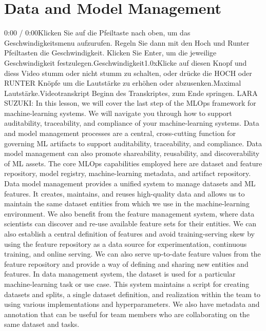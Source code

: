 {{{{{{{{\section{Data and Model Management}

    0:00 / 0:00Klicken Sie auf die Pfeiltaste nach oben, um das Geschwindigkeitsmenu aufzurufen. Regeln Sie dann mit den Hoch und Runter Pfeiltasten die Geschwindigkeit. Klicken Sie Enter, um die jeweilige Geschwindigkeit festzulegen.Geschwindigkeit1.0xKlicke auf diesen Knopf und diess Video stumm oder nicht stumm zu schalten, oder drücke die HOCH oder RUNTER Knöpfe um die Lautstärke zu erhöhen oder abzusenken.Maximal Lautstärke.Videotranskript
    Beginn des Transkriptes, zum Ende springen.
    LARA SUZUKI: In this lesson, we will cover the last step of the MLOps
    framework for machine-learning systems.
    We will navigate you through how to support auditability, traceability,
    and compliance of your machine-learning systems.
    Data and model management processes are a central, cross-cutting function
    for governing ML artifacts to support auditability, traceability,
    and compliance.
    Data model management can also promote shareability, reusability,
    and discoverability of ML assets.
    The core MLOps capabilities employed here
    are dataset and feature repository, model registry,
    machine-learning metadata, and artifact repository.
    Data model management provides a unified system
    to manage datasets and ML features.
    It creates, maintains, and reuses high-quality data
    and allows us to maintain the same dataset entities from which we use
    in the machine-learning environment.
    We also benefit from the feature management system,
    where data scientists can discover and re-use available feature sets
    for their entities.
    We can also establish a central definition of features
    and avoid training-serving skew by using the feature repository
    as a data source for experimentation, continuous training,
    and online serving.
    We can also serve up-to-date feature values from the feature repository
    and provide a way of defining and sharing new entities and features.
    In data management system, the dataset is
    used for a particular machine-learning task or use case.
    This system maintains a script for creating datasets and splits,
    a single dataset definition, and realization
    within the team to using various implementations and hyperparameters.
    We also have metadata and annotation that
    can be useful for team members who are collaborating
    on the same dataset and tasks.
}}}}}}}}
